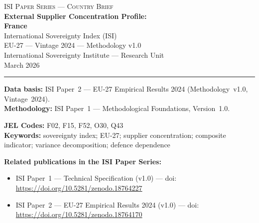\documentclass[12pt,a4paper]{article}
\begin{document}
\hypersetup{pageanchor=false}

\begin{titlepage}
\centering
\vspace*{2cm}
{\Large\textsc{ISI Paper Series --- Country Brief}}\\[1.2cm]
{\LARGE\bfseries External Supplier Concentration Profile:\\[0.3em]
France}\\[1.5cm]
{\large International Sovereignty Index (ISI)\\[0.3em]
EU-27 --- Vintage 2024 --- Methodology v1.0}\\[1.2cm]
{\large International Sovereignty Institute --- Research Unit}\\[0.8cm]
{\large March 2026}

\vspace{0.8cm}
\noindent\rule{\textwidth}{0.4pt}
\vspace{0.4cm}

\begin{flushleft}
\noindent\textbf{Data basis:} ISI Paper~2 --- EU-27 Empirical Results 2024 (Methodology~v1.0, Vintage~2024).\\[4pt]
\noindent\textbf{Methodology:} ISI Paper~1 --- Methodological Foundations, Version~1.0.

\medskip

\noindent\textbf{JEL Codes:} F02, F15, F52, O30, Q43\\[4pt]
\noindent\textbf{Keywords:} sovereignty index; EU-27; supplier concentration; composite indicator; variance decomposition; defence dependence

\medskip

\noindent\textbf{Related publications in the ISI Paper Series:}
\begin{itemize}[nosep,leftmargin=1.5em]
\item ISI Paper~1 --- Technical Specification (v1.0) --- doi:\\
  \url{https://doi.org/10.5281/zenodo.18764227}
\item ISI Paper~2 --- EU-27 Empirical Results 2024 (v1.0) --- doi:\\
  \url{https://doi.org/10.5281/zenodo.18764170}
\end{itemize}
\end{flushleft}
\vfill
\end{titlepage}
\end{document}
